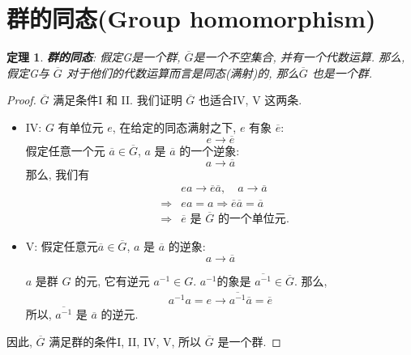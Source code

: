 \documentclass[utf8]{ctexbook}
\newtheorem{theorem}{定理}[section]
\begin{document}
\section{群的同态(Group homomorphism)}

\begin{theorem}\label{thm_group_homomorphism}
\textbf{群的同态}: 假定G是一个群, $\overline{G}$是一个不空集合, 并有一个代数运算. 那么, 假定G与 $\overline{G}$ 对于他们的代数运算而言是同态(满射)的, 那么$\overline{G}$ 也是一个群.
\end{theorem}

\begin{proof}

$\overline{G}$ 满足条件I 和 II. 我们证明 $\overline{G}$ 也适合IV, V 这两条.

\begin{itemize}
\item{IV: $G$ 有单位元 $e$, 在给定的同态满射之下, $e$ 有象 $\overline{e}$:
\begin{equation}
e \longrightarrow \overline{e}
\end{equation}
假定任意一个元 $\overline{a} \in \overline{G}$, $a$ 是 $\overline{a}$ 的一个逆象:
\begin{equation}
a \longrightarrow \overline{a}
\end{equation}
那么, 我们有
\begin{eqnarray}
& & ea \longrightarrow \overline{e} \overline{a}, \quad a \longrightarrow \overline{a} \\
&\Rightarrow & ea = a \Rightarrow \overline{e}\overline{a} = \overline{a} \\
&\Rightarrow & \mbox{$\overline{e}$ 是 $\overline{G}$ 的一个单位元}.
\end{eqnarray}

}

\item{V: 假定任意元$\overline{a} \in \overline{G}$, $a$ 是 $\overline{a}$ 的逆象:
\begin{equation}
a \longrightarrow \overline{a}
\end{equation}

$a$ 是群 $G$ 的元, 它有逆元 $a^{-1} \in G$. $a^{-1}$的象是 $\overline{a^{-1}} \in \overline{G}$. 那么,
\begin{eqnarray}
a^{-1} a = e \longrightarrow \overline{a^{-1}} \overline{a} = \overline{e} 
\end{eqnarray}
所以, $\overline{a^{-1}}$ 是 $\overline{a}$ 的逆元.
}
\end{itemize}

因此, $\overline{G}$ 满足群的条件I, II, IV, V, 所以 $\overline{G}$ 是一个群.

\end{proof}
\end{document}
